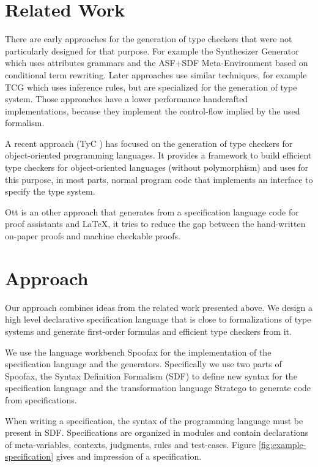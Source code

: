 \documentclass[preprint]{sigplanconf}
\begin{document}
\section{Related Work}
There are early approaches for the generation of type checkers that
were not particularly designed for that purpose. For example the
Synthesizer Generator \cite{Reps:1984:SG:800020.808247} which uses
attributes grammars and the ASF+SDF Meta-Environment
\cite{vandenBrand:2001:AMC:647477.727788} based on conditional term
rewriting. Later approaches use similar techniques, for example TCG
\cite{phd/de/Gast2005} which uses inference rules, but are specialized
for the generation of type system. Those approaches have a lower
performance handcrafted implementations, because they implement the
control-flow implied by the used formalism.

A recent approach (TyC \cite{ortin2014automatic}) has focused on the
generation of type checkers for object-oriented programming
languages. It provides a framework to build efficient type checkers
for object-oriented languages (without polymorphism) and uses for this
purpose, in most parts, normal program code that implements an
interface to specify the type system.

Ott \cite{journals/jfp/SewellNOPRSS10} is an other approach that
generates from a specification language code for proof assistants and
\LaTeX, it tries to reduce the gap between the hand-written on-paper
proofs and machine checkable proofs.
\section{Approach}
Our approach combines ideas from the related work presented above. We
design a high level declarative specification language that is close
to formalizations of type systems and generate first-order formulas
and efficient type checkers from it.

We use the language workbench Spoofax \cite{KatsVisser2010} for the
implementation of the specification language and the
generators. Specifically we use two parts of Spoofax, the Syntax
Definition Formalism (SDF) to define new syntax for the specification
language and the transformation language Stratego to generate code
from specifications. 

When writing a specification, the syntax of the programming language
must be present in SDF. Specifications are organized in modules and
contain declarations of meta-variables, contexts, judgments, rules and
test-cases. Figure \ref{fig:example-specification} gives and
impression of a specification.
\end{document}
